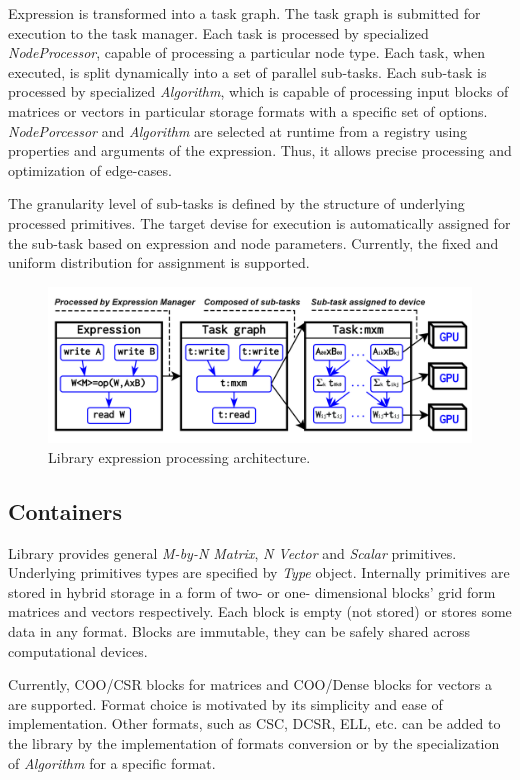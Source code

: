 Expression is transformed into a task graph. 
The task graph is submitted for execution to the task manager. 
Each task is processed by specialized \textit{NodeProcessor}, capable of processing a particular node type.
Each task, when executed, is split dynamically into a set of parallel sub-tasks. 
Each sub-task is processed by specialized \textit{Algorithm}, which is capable of processing input blocks of matrices or vectors in particular storage formats with a specific set of options. \textit{NodePorcessor} and \textit{Algorithm} are selected at runtime from a registry using properties and arguments of the expression. 
Thus, it allows precise processing and optimization of edge-cases.

The granularity level of sub-tasks is defined by the structure of underlying processed primitives. 
The target devise for execution is automatically assigned for the sub-task based on expression and node parameters. 
Currently, the fixed and uniform distribution for assignment is supported.

\begin{figure}[t]
\includegraphics[width=0.99\linewidth]{figures/library_architecture.png}
\caption{Library expression processing architecture.}
\label{fig:architecture}
\end{figure}
    
\subsection{Containers}

Library provides general \textit{M-by-N Matrix}, \textit{N Vector} and \textit{Scalar} primitives.
Underlying primitives types are specified by \textit{Type} object. 
Internally primitives are stored in hybrid storage in a form of two- or one- dimensional blocks' grid form matrices and vectors respectively. 
Each block is empty (not stored) or stores some data in any format. Blocks are immutable, they can be safely shared across computational devices.

Currently, COO/CSR blocks for matrices and COO/Dense blocks for vectors a are supported. Format choice is motivated by its simplicity and ease of implementation. 
Other formats, such as CSC, DCSR, ELL, etc. can be added to the library by the implementation of formats conversion or by the specialization of \textit{Algorithm} for a specific format.

